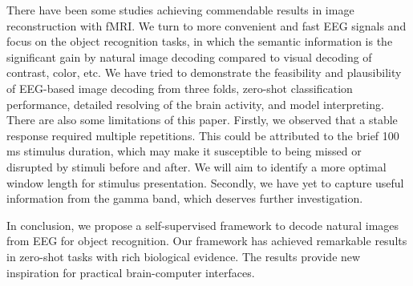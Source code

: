 \label{sec:discussion}
There have been some studies achieving commendable results in image reconstruction with fMRI.
We turn to more convenient and fast EEG signals and focus on the object recognition tasks, in which the semantic information is the significant gain by natural image decoding compared to visual decoding of contrast, color, etc.
We have tried to demonstrate the feasibility and plausibility of EEG-based image decoding from three folds, zero-shot classification performance, detailed resolving of the brain activity, and model interpreting.
There are also some limitations of this paper.
Firstly, we observed that a stable response required multiple repetitions. 
This could be attributed to the brief 100 ms stimulus duration, which may make it susceptible to being missed or disrupted by stimuli before and after. 
We will aim to identify a more optimal window length for stimulus presentation.
Secondly, we have yet to capture useful information from the gamma band, which deserves further investigation.

In conclusion, we propose a self-supervised framework to decode natural images from EEG for object recognition.
Our framework has achieved remarkable results in zero-shot tasks with rich biological evidence.
The results provide new inspiration for practical brain-computer interfaces.